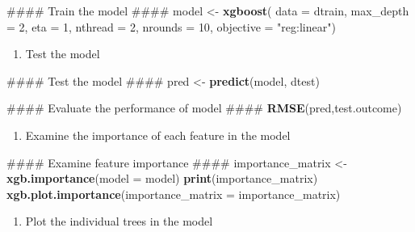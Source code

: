 \documentclass[]{book}
\newenvironment{Shaded}{\begin{snugshade}}{\end{snugshade}}
\newcommand{\KeywordTok}[1]{\textcolor[rgb]{0.13,0.29,0.53}{\textbf{#1}}}
\newcommand{\DataTypeTok}[1]{\textcolor[rgb]{0.13,0.29,0.53}{#1}}
\newcommand{\DecValTok}[1]{\textcolor[rgb]{0.00,0.00,0.81}{#1}}
\newcommand{\StringTok}[1]{\textcolor[rgb]{0.31,0.60,0.02}{#1}}
\newcommand{\NormalTok}[1]{#1}
\providecommand{\tightlist}{%
  \setlength{\itemsep}{0pt}\setlength{\parskip}{0pt}}
\begin{document}
\begin{Shaded}
\begin{Highlighting}[]
\NormalTok{#### Train the model ####}
\NormalTok{model <-}\StringTok{ }\KeywordTok{xgboost}\NormalTok{(}
  \DataTypeTok{data =}\NormalTok{ dtrain, }\DataTypeTok{max_depth =} \DecValTok{2}\NormalTok{, }\DataTypeTok{eta =} \DecValTok{1}\NormalTok{, }\DataTypeTok{nthread =} \DecValTok{2}\NormalTok{, }\DataTypeTok{nrounds =} \DecValTok{10}\NormalTok{,}
  \DataTypeTok{objective =} \StringTok{"reg:linear"}\NormalTok{)}
\end{Highlighting}
\end{Shaded}

\begin{enumerate}
\def\labelenumi{\arabic{enumi})}
\setcounter{enumi}{5}
\tightlist
\item
  Test the model
\end{enumerate}

\begin{Shaded}
\begin{Highlighting}[]
\NormalTok{#### Test the model ####}
\NormalTok{pred <-}\StringTok{ }\KeywordTok{predict}\NormalTok{(model, dtest)}

\NormalTok{#### Evaluate the performance of model ####}
\KeywordTok{RMSE}\NormalTok{(pred,test.outcome)}
\end{Highlighting}
\end{Shaded}

\begin{enumerate}
\def\labelenumi{\arabic{enumi})}
\setcounter{enumi}{6}
\tightlist
\item
  Examine the importance of each feature in the model
\end{enumerate}

\begin{Shaded}
\begin{Highlighting}[]
\NormalTok{#### Examine feature importance ####}
\NormalTok{importance_matrix <-}\StringTok{ }\KeywordTok{xgb.importance}\NormalTok{(}\DataTypeTok{model =}\NormalTok{ model)}
\KeywordTok{print}\NormalTok{(importance_matrix)}
\KeywordTok{xgb.plot.importance}\NormalTok{(}\DataTypeTok{importance_matrix =}\NormalTok{ importance_matrix)}
\end{Highlighting}
\end{Shaded}

\begin{enumerate}
\def\labelenumi{\arabic{enumi})}
\setcounter{enumi}{7}
\tightlist
\item
  Plot the individual trees in the model
\end{enumerate}
\end{document}
